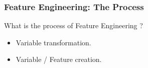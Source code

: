 \begin{frame}[fragile]\frametitle{Feature Engineering: The Process}
What is the process of Feature Engineering ?
	\begin{itemize}
	\item Variable transformation.
	\item Variable / Feature creation.
	\end{itemize}
\begin{center}
\end{center}
\end{frame}





	
